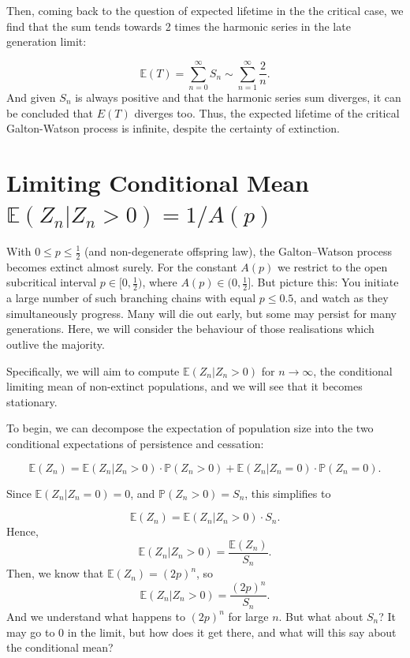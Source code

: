 \documentclass[11pt,a4paper]{article}
\theoremstyle{plain}
\theoremstyle{definition}
\begin{document}
Then, coming back to the question of expected lifetime in the the critical case, we find that the sum tends towards 2 times the harmonic series in the late generation limit:

$$\mathbb{E}(T) = \sum_{n=0}^{\infty} S_n \sim \sum_{n=1}^{\infty} \frac{2}{n}.$$
And given $S_n$ is always positive and that the harmonic series sum diverges, it can be concluded that $E(T)$ diverges too. Thus, the expected lifetime of the critical Galton-Watson process is infinite, despite the certainty of extinction.






\section{Limiting Conditional Mean $\mathbb{E}(Z_n|Z_n>0) = 1/A(p)$}


With $0 \le p \le \tfrac12$ (and non-degenerate offspring law), the Galton--Watson process becomes extinct almost surely. For the constant $A(p)$ we restrict to the open subcritical interval $p\in[0,\tfrac12)$, where $A(p)\in(0,\tfrac12]$. But picture this: You 
initiate a large number of such branching chains with equal $p\leq 0.5$, and watch as they simultaneously progress. 
Many will die out early, but some may persist for many generations. Here, we will consider the behaviour of those realisations
which outlive the majority. 

Specifically, we will aim to compute $\mathbb{E}(Z_n|Z_n>0)$ for $n\to \infty$, the conditional limiting mean 
of non-extinct populations, and we will see that it becomes stationary.

\vspace{20pt}

\noindent
To begin, we can decompose the expectation of population size into the two conditional expectations of persistence and cessation: 

$$\mathbb{E}(Z_n) = \mathbb{E}(Z_n|Z_n>0)\cdot\mathbb{P}(Z_n>0) + \mathbb{E}(Z_n|Z_n=0)\cdot\mathbb{P}(Z_n=0).$$

\noindent
Since $\mathbb{E}(Z_n|Z_n=0) = 0$, and $\mathbb{P}(Z_n > 0) = S_n$, this simplifies to

$$\mathbb{E}(Z_n) = \mathbb{E}(Z_n|Z_n>0)\cdot S_n.$$
Hence,
$$\mathbb{E}(Z_n|Z_n>0) = \frac{\mathbb{E}(Z_n)}{S_n}.$$
Then, we know that $\mathbb{E}(Z_n) = (2p)^n$, so
$$\mathbb{E}(Z_n|Z_n>0) = \frac{(2p)^n}{S_n}.$$
And we understand what happens to $(2p)^n$ for large $n$. But what about $S_n$? It may go to 0 in the limit, but how does it get there, and what will this say about the conditional mean?
\end{document}
